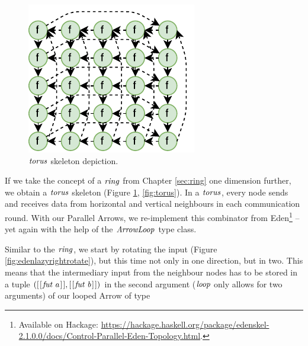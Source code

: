 \documentclass[paper=A4,twoside=true,openright,parskip=full,chapterprefix=true,headings=normal,bibliography=totoc,listof=totoc,titlepage=on,captions=tableabove,draft=false,british]{scrreprt}%
\begin{document}
\label{sec:torus}

\begin{figure}
\centering
\includegraphics{src/img/ringTorusImg.pdf}
\caption{\ensuremath{\Varid{torus}} skeleton depiction.\label{fig:ringTorusImg}}
\end{figure}

If we take the concept of a \ensuremath{\Varid{ring}} from Chapter \ref{sec:ring} one
dimension further, we obtain a \ensuremath{\Varid{torus}} skeleton (Figure
\ref{fig:ringTorusImg}, \ref{fig:torus}). In a \ensuremath{\Varid{torus}}, every node sends
and receives data from horizontal and vertical neighbours in each
communication round. With our Parallel Arrows, we re-implement this
combinator from Eden\footnote{Available on Hackage:
  \url{https://hackage.haskell.org/package/edenskel-2.1.0.0/docs/Control-Parallel-Eden-Topology.html}.}
-- yet again with the help of the \ensuremath{\Conid{ArrowLoop}} type class.

Similar to the \ensuremath{\Varid{ring}}, we start by rotating the input (Figure
\ref{fig:edenlazyrightrotate}), but this time not only in one direction,
but in two. This means that the intermediary input from the neighbour
nodes has to be stored in a tuple \ensuremath{([\mskip1.5mu [\mskip1.5mu \Varid{fut}\;\Varid{a}\mskip1.5mu]\mskip1.5mu],[\mskip1.5mu [\mskip1.5mu \Varid{fut}\;\Varid{b}\mskip1.5mu]\mskip1.5mu])} in the second
argument (\ensuremath{\Varid{loop}} only allows for two arguments) of our looped Arrow of
type


\resethooks
\vspace{-2\baselineskip}
\end{document}
